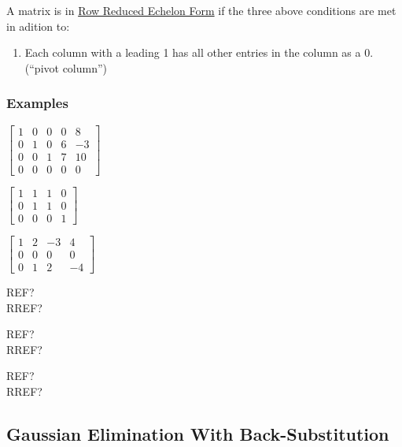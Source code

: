 \documentclass[
  letterpaper,
  DIV=11,
  numbers=noendperiod]{scrartcl}
\providecommand{\tightlist}{%
  \setlength{\itemsep}{0pt}\setlength{\parskip}{0pt}}\usepackage{longtable,booktabs,array}
\begin{document}
A matrix is in \ul{Row Reduced Echelon Form} if the three above
conditions are met in adition to:

\begin{enumerate}
\def\labelenumi{(\alph{enumi})}
\setcounter{enumi}{3}
\tightlist
\item
  Each column with a leading 1 has all other entries in the column as a
  0. (``pivot column'')
\end{enumerate}

\newpage{}

\hypertarget{examples-1}{%
\subsubsection{Examples}\label{examples-1}}

\begin{multicols}{2}
$\begin{bmatrix}1 & 0 & 0 & 0 & 8\\ 0 & 1 & 0 & 6 & -3 \\ 0 & 0 & 1 & 7 & 10\\ 0 & 0 & 0 & 0 & 0 \end{bmatrix}$

$\begin{bmatrix}1 & 1 & 1 & 0 \\ 0 & 1 & 1 & 0 \\ 0 & 0 & 0 & 1 \end{bmatrix}$

$\begin{bmatrix}1 & 2 & -3 & 4 \\ 0 & 0 & 0 & 0 \\ 0 & 1 & 2 & -4\end{bmatrix}$
\columnbreak

REF? \checkmark \\
RREF? \checkmark \\

\vspace{1cm}

REF? \checkmark \\
RREF? \times \\

\vspace{1cm}

REF? \times \\
RREF? \times

\end{multicols}

\hypertarget{gaussian-elimination-with-back-substitution}{%
\subsection{\texorpdfstring{Gaussian Elimination With
\textbf{Back-Substitution}}{Gaussian Elimination With Back-Substitution}}\label{gaussian-elimination-with-back-substitution}}
\end{document}
